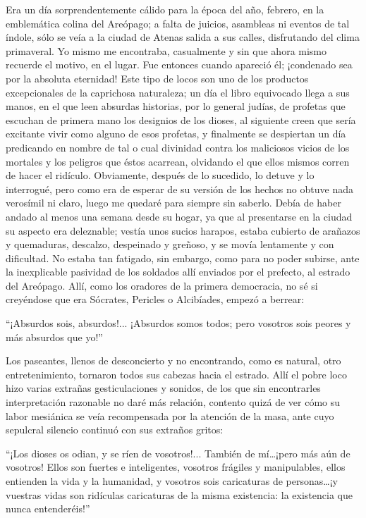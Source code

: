 \documentclass[11pt,openany]{book}
\begin{document}
Era un día sorprendentemente cálido para la época del año, febrero, en la emblemática colina del Areópago; a falta de juicios, asambleas ni eventos de tal índole, sólo se veía a la ciudad de Atenas salida a sus calles, disfrutando del clima primaveral. Yo mismo me encontraba, casualmente y sin que ahora mismo recuerde el motivo, en el lugar. Fue entonces cuando apareció él; ¡condenado sea por la absoluta eternidad! Este tipo de locos son uno de los productos excepcionales de la caprichosa naturaleza; un día el libro equivocado llega a sus manos, en el que leen absurdas historias, por lo general judías, de profetas que escuchan de primera mano los designios de los dioses, al siguiente creen que sería excitante vivir como alguno de esos profetas, y finalmente se despiertan un día predicando en nombre de tal o cual divinidad contra los maliciosos vicios de los mortales y los peligros que éstos acarrean, olvidando el que ellos mismos corren de hacer el ridículo. Obviamente, después de lo sucedido, lo detuve y lo interrogué, pero como era de esperar de su versión de los hechos no obtuve nada verosímil ni claro, luego me quedaré para siempre sin saberlo. Debía de haber andado al menos una semana desde su hogar, ya que al presentarse en la ciudad su aspecto era deleznable; vestía unos sucios harapos, estaba cubierto de arañazos y quemaduras, descalzo, despeinado y greñoso, y se movía lentamente y con dificultad. No estaba tan fatigado, sin embargo, como para no poder subirse, ante la inexplicable pasividad de los soldados allí enviados por el prefecto, al estrado del Areópago. Allí, como los oradores de la primera democracia, no sé si creyéndose que era Sócrates, Pericles o Alcibíades, empezó a berrear: 

“¡Absurdos sois, absurdos!... ¡Absurdos somos todos; pero vosotros sois peores y más absurdos que yo!” 

Los paseantes, llenos de desconcierto y no encontrando, como es natural, otro entretenimiento, tornaron todos sus cabezas hacia el estrado. Allí el pobre loco hizo varias extrañas gesticulaciones y sonidos, de los que sin encontrarles interpretación razonable no daré más relación, contento quizá de ver cómo su labor mesiánica se veía recompensada por la atención de la masa, ante cuyo sepulcral silencio continuó con sus extraños gritos: 

“¡Los dioses os odian, y se ríen de vosotros!... También de mí\dots ¡pero más aún de vosotros! Ellos son fuertes e inteligentes, vosotros frágiles y manipulables, ellos entienden la vida y la humanidad, y vosotros sois caricaturas de personas\dots ¡y vuestras vidas son ridículas caricaturas de la misma existencia: la existencia que nunca entenderéis!” 
\end{document}
